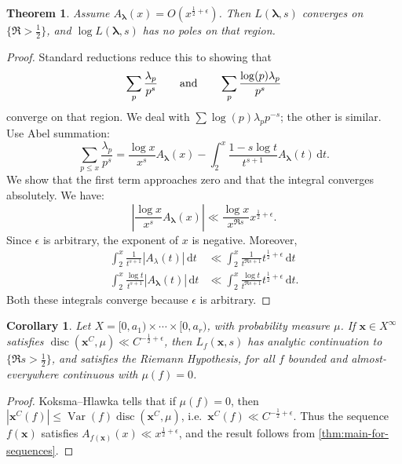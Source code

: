 \documentclass{article}
\DeclareMathOperator{\disc}{disc}
\DeclareMathOperator{\Var}{Var}
\newcommand{\blambda}{{\boldsymbol{\lambda}}}
\newcommand{\bx}{\boldsymbol{x}}
\newcommand{\dd}{\mathrm{d}}
\newtheorem{theorem}[subsection]{Theorem}
\newtheorem{corollary}[subsection]{Corollary}
\theoremstyle{definition}
\begin{document}
\begin{theorem}\label{thm:main-for-sequences}
Assume $A_\blambda(x) = O(x^{\frac 1 2 +\epsilon})$. Then $L(\blambda,s)$ 
converges on $\{\Re>\frac 1 2\}$, and $\log L(\blambda,s)$ has no poles on that 
region. 
\end{theorem}
\begin{proof}
Standard reductions reduce this to showing that 
\[
	\sum_p \frac{\lambda_p}{p^s} \qquad \textnormal{and}\qquad \sum_p \frac{\log(p) \lambda_p}{p^s} 
\]
converge on that region. We deal with $\sum \log(p)\lambda_p p^{-s}$; the 
other is similar. Use Abel summation:
\[
	\sum_{p\leqslant x} \frac{\lambda_p}{p^s}
		= \frac{\log x}{x^s} A_\blambda(x) - \int_2^x \frac{1-s\log t}{t^{s+1}} A_\blambda(t)\, \dd t .
\]
We show that the first term approaches zero and that the integral converges 
absolutely. We have: 
\[
	\left| \frac{\log x}{x^s} A_\blambda(x)\right| \ll \frac{\log x}{x^{\Re s}} x^{\frac 1 2+\epsilon}  .
\]
Since $\epsilon$ is arbitrary, the exponent of $x$ is negative. Moreover, 
\begin{align*}
	\int_2^x \frac{1}{t^{s+1}} | A_\lambda(t)|\, \dd t
		& \ll \int_2^x \frac{1}{t^{\Re s+1}} t^{\frac 1 2+\epsilon} \, \dd t \\
	\int_2^x \frac{\log t}{t^{s+1}} |A_\blambda(t)|\, \dd t
		& \ll \int_2^x \frac{\log t}{t^{\Re s+1}} t^{\frac 1 2+\epsilon}\, \dd t .
\end{align*}
Both these integrals converge because $\epsilon$ is arbitrary. 
\end{proof}

\begin{corollary}\label{cor:ATRH}
Let $X=[0,a_1)\times\cdots\times[0,a_r)$, with probability measure $\mu$. If 
$\bx\in X^\infty$ satisfies $\disc(\bx^C,\mu)\ll C^{-\frac 1 2+\epsilon}$, then 
$L_f(\bx,s)$ has analytic continuation to $\{\Re s>\frac 1 2\}$, and satisfies 
the Riemann Hypothesis, for all $f$ bounded and almost-everywhere continuous 
with $\mu(f)=0$. 
\end{corollary}
\begin{proof}
Koksma--Hlawka tells that if $\mu(f)=0$, then 
$|\bx^C(f)|\leqslant \Var(f) \disc(\bx^C,\mu)$, 
i.e.~$\bx^C(f)\ll C^{-\frac 1 2+\epsilon}$. Thus the sequence 
$f(\bx)$ satisfies $A_{f(\bx)}(x) \ll x^{\frac 1 2+\epsilon}$, and the result 
follows from \autoref{thm:main-for-sequences}. 
\end{proof}
\end{document}
